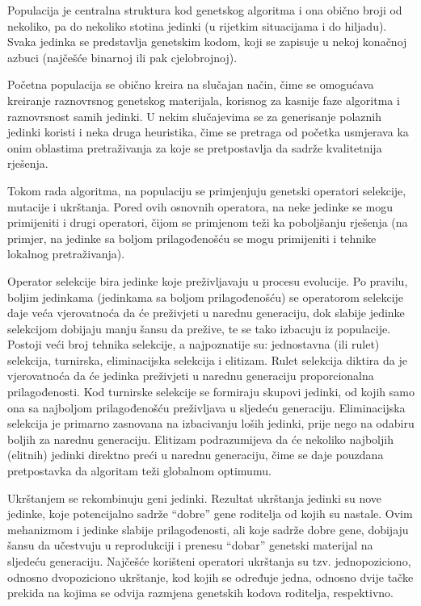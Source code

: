\documentclass[a4paper, utf8, 11pt, colorlinks]{book}
\begin{document}
Populacija je centralna struktura kod genetskog algoritma i ona  obično broji od nekoliko, pa do nekoliko stotina jedinki (u rijetkim situacijama i do hiljadu). Svaka jedinka se predstavlja genetskim kodom, koji se zapisuje u nekoj konačnoj azbuci (najčešće binarnoj ili pak cjelobrojnoj).


Početna populacija se obično kreira na slučajan način, čime se omogućava kreiranje raznovrsnog genetskog materijala, korisnog za kasnije faze algoritma i raznovrsnost samih jedinki. U nekim slučajevima se za generisanje polaznih jedinki koristi i neka druga heuristika, čime se pretraga od početka usmjerava ka onim oblastima pretraživanja za koje se pretpostavlja da sadrže kvalitetnija rješenja.

Tokom rada algoritma, na populaciju se primjenjuju genetski operatori selekcije, mutacije i ukrštanja. Pored ovih osnovnih operatora, na neke jedinke se mogu primijeniti i drugi operatori, čijom se primjenom teži ka poboljšanju rješenja (na primjer, na jedinke sa boljom prilagođenošću se mogu primijeniti i tehnike lokalnog  pretraživanja).

Operator selekcije bira jedinke koje preživljavaju u procesu evolucije. Po pravilu, boljim jedinkama (jedinkama sa boljom prilagođenošću) se operatorom selekcije daje veća vjerovatnoća da će preživjeti u narednu generaciju, dok  slabije jedinke selekcijom dobijaju manju šansu da prežive, te se tako izbacuju iz populacije. Postoji veći broj tehnika selekcije, a najpoznatije su: jednostavna (ili rulet) selekcija, turnirska, eliminacijska selekcija i elitizam. Rulet selekcija diktira da je vjerovatnoća da će jedinka preživjeti u narednu generaciju proporcionalna prilagođenosti. Kod turnirske selekcije se formiraju skupovi jedinki, od kojih samo ona sa najboljom prilagođenošću preživljava u sljedeću generaciju. Eliminacijska selekcija je primarno zasnovana na izbacivanju loših jedinki, prije nego na odabiru boljih za narednu generaciju. Elitizam podrazumijeva da će nekoliko najboljih (elitnih) jedinki direktno preći u narednu generaciju, čime se daje pouzdana pretpostavka da  algoritam teži globalnom optimumu.

Ukrštanjem se rekombinuju geni jedinki. Rezultat ukrštanja jedinki su nove jedinke, koje potencijalno sadrže ``dobre'' gene  roditelja od kojih su nastale. Ovim mehanizmom  i jedinke slabije prilagođenosti, ali koje sadrže dobre gene, dobijaju šansu da učestvuju u reprodukciji i prenesu ``dobar'' genetski materijal na sljedeću generaciju. Najčešće korišteni operatori ukrštanja su tzv. jednopoziciono, odnosno dvopoziciono ukrštanje, kod kojih se određuje jedna, odnosno dvije tačke prekida na kojima se odvija razmjena genetskih kodova roditelja, respektivno.
\end{document}
